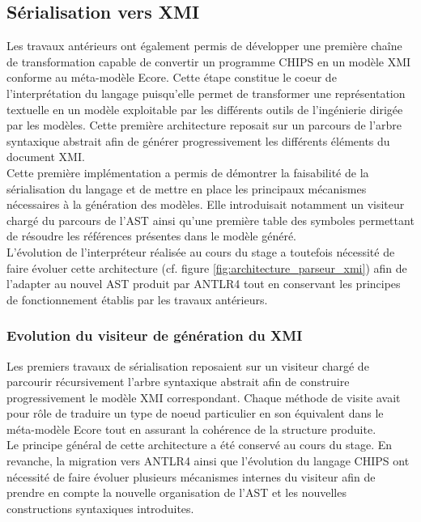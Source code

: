 \subsection{Sérialisation vers XMI}
\label{sec:XMI}

Les travaux antérieurs ont également permis de développer une première chaîne de transformation capable de convertir un programme CHIPS en un modèle XMI conforme au méta-modèle Ecore. Cette étape constitue le coeur de l'interprétation du langage puisqu'elle permet de transformer une représentation textuelle en un modèle exploitable par les différents outils de l'ingénierie dirigée par les modèles. Cette première architecture reposait sur un parcours de l'arbre syntaxique abstrait afin de générer progressivement les différents éléments du document XMI. \\

Cette première implémentation a permis de démontrer la faisabilité de la sérialisation du langage et de mettre en place les principaux mécanismes nécessaires à la génération des modèles. Elle introduisait notamment un visiteur chargé du parcours de l'AST ainsi qu'une première table des symboles permettant de résoudre les références présentes dans le modèle généré. \\

L'évolution de l'interpréteur réalisée au cours du stage a toutefois nécessité de faire évoluer cette architecture (cf. figure \ref{fig:architecture_parseur_xmi}) afin de l'adapter au nouvel AST produit par ANTLR4 tout en conservant les principes de fonctionnement établis par les travaux antérieurs. \\

\subsubsection{Evolution du visiteur de génération du XMI}
\label{sec:generation_XMI}

Les premiers travaux de sérialisation reposaient sur un visiteur chargé de parcourir récursivement l'arbre syntaxique abstrait afin de construire progressivement le modèle XMI correspondant. Chaque méthode de visite avait pour rôle de traduire un type de noeud particulier en son équivalent dans le méta-modèle Ecore tout en assurant la cohérence de la structure produite. \\

Le principe général de cette architecture a été conservé au cours du stage. En revanche, la migration vers ANTLR4 ainsi que l'évolution du langage CHIPS ont nécessité de faire évoluer plusieurs mécanismes internes du visiteur afin de prendre en compte la nouvelle organisation de l'AST et les nouvelles constructions syntaxiques introduites. \\


